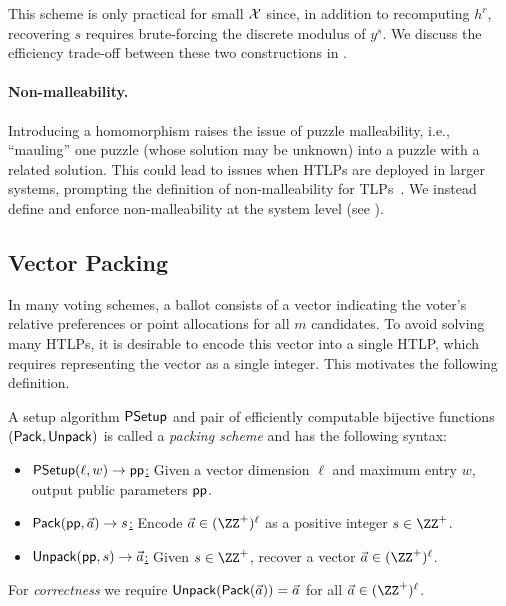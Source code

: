 This scheme is only practical for small $\mathcal{X}$ since, in addition to recomputing $h^r$, recovering $s$ requires brute-forcing the discrete modulus of $y^s$. We discuss the efficiency trade-off between these two constructions in .

\paragraph{Non-malleability.}
Introducing a homomorphism raises the issue of puzzle malleability, i.e., ``mauling'' one puzzle (whose solution may be unknown) into a puzzle with a related solution. This could lead to issues when HTLPs are deployed in larger systems, prompting the definition of non-malleability for TLPs~\cite{TCC:FKPS21}. We instead define and enforce non-malleability at the system level (see ).

\subsection{Vector Packing}\label{sec:packing}

In many voting schemes, a ballot consists of a vector indicating the voter's relative preferences or point allocations for all $m$ candidates. To avoid solving many HTLPs, it is desirable to encode this vector into a single HTLP, which requires representing the vector as a single integer. This motivates the following definition.

\begin{definition}\label{def:packing}
A setup algorithm $\mathsf{PSetup}$ and pair of efficiently computable bijective functions $(\mathsf{Pack},\mathsf{Unpack})$ is called a \emph{packing scheme} and has the following syntax:
    \begin{itemize}
        \item \underline{$\mathsf{PSetup}(\ell, w) \to \mathsf{pp}$:} Given a vector dimension $\ell$ and maximum entry $w$, output public parameters $\mathsf{pp}$.
        \item \underline{$\mathsf{Pack}(\mathsf{pp}, \Vec{a}) \to s$:} Encode $\Vec{a} \in (\ZZ^+)^\ell$ as a positive integer $s \in \ZZ^+$. 
        \item \underline{$\mathsf{Unpack}(\mathsf{pp}, s) \to \Vec{a}$:} Given $s \in \ZZ^+$, recover a vector $\Vec{a} \in (\ZZ^+)^\ell$. 
    \end{itemize}
For \emph{correctness} we require $\mathsf{Unpack}(\mathsf{Pack}(\Vec{a}))=\Vec{a}$ for all $\Vec{a}\in (\ZZ^+)^\ell$.
\end{definition}

